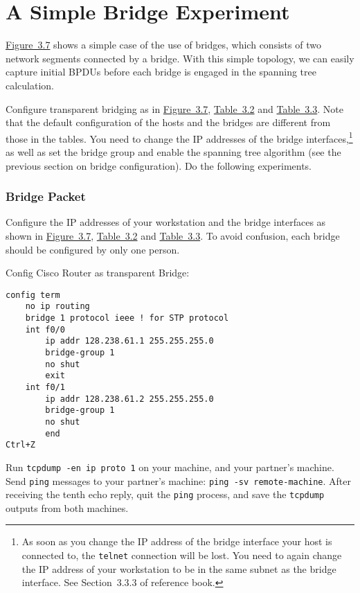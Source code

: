 \documentclass{../UTNetLab}
\begin{document}
\part{A Simple Bridge Experiment}
    \hyperref[fig:3.7]{Figure~3.7} shows a simple case of the use of bridges, which consists of two network segments connected by a bridge.
    With this simple topology, we can easily capture initial BPDUs before each bridge is engaged in the spanning tree calculation.

    Configure transparent bridging as in \hyperref[fig:3.7]{Figure~3.7}, \hyperref[tab:3.2]{Table~3.2} and \hyperref[tab:3.3]{Table~3.3}.
    Note that the default configuration of the hosts and the bridges are different from those in the tables.
    You need to change the IP addresses of the bridge interfaces,\footnote{As soon as you change the IP address of the bridge interface your host is connected to, the \lstinline{telnet} connection will be lost.
    You need to again change the IP address of your workstation to be in the same subnet as the bridge interface. See Section~3.3.3  of reference book.} as well as set the bridge group and enable the spanning tree algorithm (see the previous section on bridge configuration).
    Do the following experiments.

\section{Bridge Packet}
    Configure the IP addresses of your workstation and the bridge interfaces as shown in \hyperref[fig:3.7]{Figure~3.7}, \hyperref[tab:3.2]{Table~3.2} and \hyperref[tab:3.3]{Table~3.3}.
    To avoid confusion, each bridge should be configured by only one person.

    Config Cisco Router as transparent Bridge:
    \begin{lstlisting}[language={cisco}]
config term
    no ip routing
    bridge 1 protocol ieee ! for STP protocol
    int f0/0
        ip addr 128.238.61.1 255.255.255.0
        bridge-group 1
        no shut
        exit
    int f0/1
        ip addr 128.238.61.2 255.255.255.0
        bridge-group 1
        no shut
        end
Ctrl+Z
    \end{lstlisting}
    
    Run \lstinline{tcpdump -en ip proto 1} on your machine, and your partner’s machine. Send \lstinline{ping} messages to your partner’s machine: \lstinline[emph={remote-machine}]{ping -sv remote-machine}.
    After receiving the tenth echo reply, quit the \lstinline{ping} process, and save the \lstinline{tcpdump} outputs from both machines.
\end{document}
